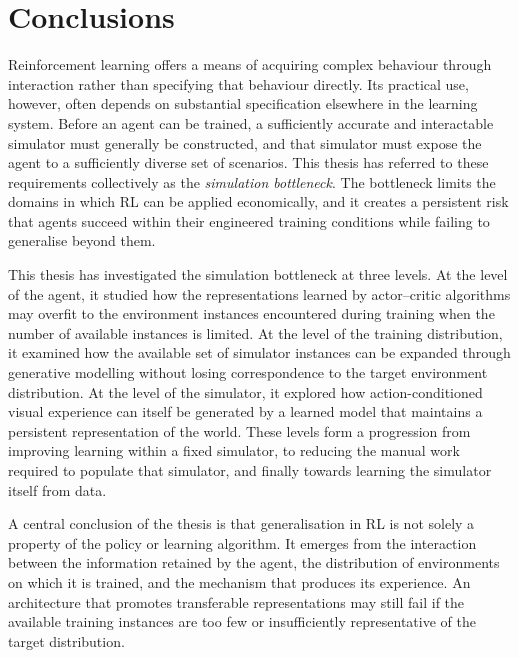 \chapter{Conclusions}
\label{chap:conclusions}

Reinforcement learning offers a means of acquiring complex behaviour through interaction rather than specifying that behaviour directly. Its practical use, however, often depends on substantial specification elsewhere in the learning system. Before an agent can be trained, a sufficiently accurate and interactable simulator must generally be constructed, and that simulator must expose the agent to a sufficiently diverse set of scenarios. This thesis has referred to these requirements collectively as the \emph{simulation bottleneck}. The bottleneck limits the domains in which RL can be applied economically, and it creates a persistent risk that agents succeed within their engineered training conditions while failing to generalise beyond them.

This thesis has investigated the simulation bottleneck at three levels. At the level of the agent, it studied how the representations learned by actor--critic algorithms may overfit to the environment instances encountered during training when the number of available instances is limited. At the level of the training distribution, it examined how the available set of simulator instances can be expanded through generative modelling without losing correspondence to the target environment distribution. At the level of the simulator, it explored how action-conditioned visual experience can itself be generated by a learned model that maintains a persistent representation of the world. These levels form a progression from improving learning within a fixed simulator, to reducing the manual work required to populate that simulator, and finally towards learning the simulator itself from data.

A central conclusion of the thesis is that generalisation in RL is not solely a property of the policy or learning algorithm. It emerges from the interaction between the information retained by the agent, the distribution of environments on which it is trained, and the mechanism that produces its experience. An architecture that promotes transferable representations may still fail if the available training instances are too few or insufficiently representative of the target distribution.

